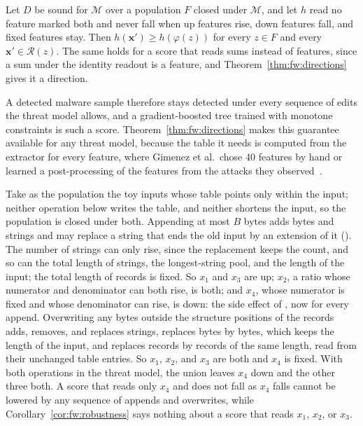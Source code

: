 \corollary[Robustness]
\label{cor:fw:robustness}
{
Let $D$ be sound for $\mathcal{M}$ over a population $F$ closed under $\mathcal{M}$, and let $h$ read no feature
marked both and never fall when up features rise, down features fall, and fixed features stay. Then
$h(\mathbf{x}') \ge h(\varphi(z))$ for every $z \in F$ and every $\mathbf{x}' \in \mathcal{R}(z)$. The same holds for a
score that reads sums instead of features, since a sum under the identity readout is a feature, and
Theorem~\ref{thm:fw:directions} gives it a direction.
}

\noindent A detected malware sample therefore stays detected under every sequence of edits the threat model allows,
and a gradient-boosted tree trained with monotone constraints is such a score. Theorem~\ref{thm:fw:directions} makes
this guarantee available for any threat model, because the table it needs is computed from the extractor for every
feature, where Gimenez et al.\ chose 40 features by hand or learned a post-processing of the features from the attacks
they observed~\cite{gimenez2025certifiably}.
\begin{runex}
Take as the population the toy inputs whose table points only within the input; neither operation below writes the
table, and neither shortens the input, so the population is closed under both. Appending at most $B$ bytes adds bytes
and strings and may replace a string that ends the old input by an extension of it
(). The number of strings can only rise, since the replacement keeps the count, and so can the
total length of strings, the longest-string pool, and the length of the input; the total length of records is fixed.
So $x_1$ and $x_3$ are up; $x_2$, a ratio whose numerator and denominator can both rise, is both; and $x_4$, whose
numerator is fixed and whose denominator can rise, is down: the side effect of , now for
every append. Overwriting any bytes outside the structure positions of the records adds, removes, and replaces
strings, replaces bytes by bytes, which keeps the length of the input, and replaces records by records of the same
length, read from their unchanged table entries. So $x_1$, $x_2$, and $x_3$ are both and $x_4$ is fixed. With both
operations in the threat model, the union leaves $x_4$ down and the other three both. A score that reads only $x_4$
and does not fall as $x_4$ falls cannot be lowered by any sequence of appends and overwrites, while
Corollary~\ref{cor:fw:robustness} says nothing about a score that reads $x_1$, $x_2$, or $x_3$.
\end{runex}
